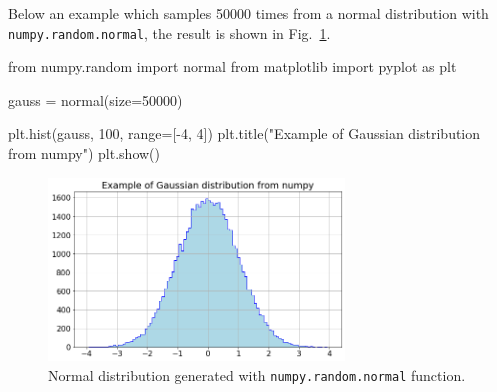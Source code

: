 Below an example which samples 50000 times from a normal distribution  with \texttt{numpy.random.normal}, the result is shown in Fig.~\ref{fig:gauss_dist}.

\begin{ipython}
from numpy.random import normal
from matplotlib import pyplot as plt

gauss = normal(size=50000)

plt.hist(gauss, 100, range=[-4, 4])
plt.title("Example of Gaussian distribution from numpy")
plt.show()
\end{ipython}

\begin{figure}
\centering
\includegraphics[width=0.7\textwidth]{figures/standard_normal}
\caption{Normal distribution generated with \texttt{numpy.random.normal} function.}
\label{fig:gauss_dist}
\end{figure}

